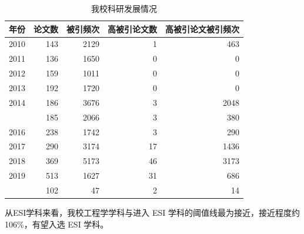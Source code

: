 \documentclass[cn, 11pt, fancy, hide]{elegantbook}
\begin{document}
\begin{table}[!h]

\caption{\label{tab:unnamed-chunk-22}我校科研发展情况}
\centering
\begin{tabular}[t]{lrrrr}
\toprule
年份 & 论文数 & 被引频次 & 高被引论文数 & 高被引论文被引频次\\
\midrule
2010 & 143 & 2129 & 1 & 463\\
2011 & 136 & 1650 & 0 & 0\\
2012 & 159 & 1011 & 0 & 0\\
2013 & 192 & 1720 & 0 & 0\\
2014 & 186 & 3676 & 3 & 2048\\
\addlinespace
2015 & 185 & 2066 & 3 & 380\\
2016 & 238 & 1742 & 3 & 290\\
2017 & 290 & 3174 & 17 & 1436\\
2018 & 369 & 5173 & 46 & 3173\\
2019 & 513 & 1627 & 31 & 686\\
\addlinespace
2020 & 102 & 47 & 2 & 14\\
\bottomrule
\end{tabular}
\end{table}

从ESI学科来看，我校工程学学科与进入 ESI 学科的阈值线最为接近，接近程度约 106\%，有望入选 ESI 学科。
\end{document}
